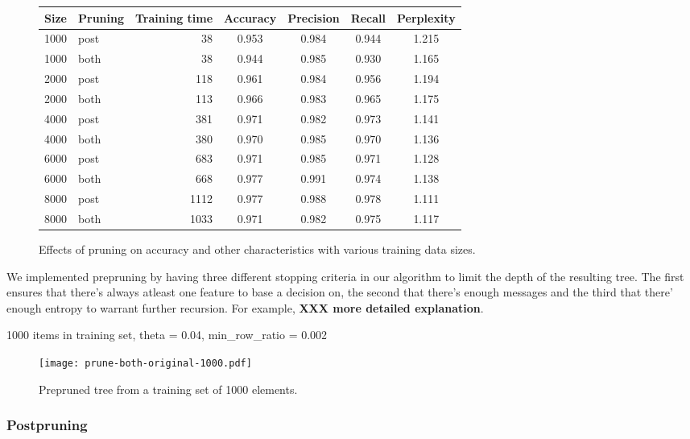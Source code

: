 \documentclass[a4paper,10pt]{article}
\newcommand{\XXX}[1]{{\bf XXX #1}}
\begin{document}
\begin{figure}
  \centering
\begin{tabular}{|l|l|r|c|c|c|c|}
\hline
Size & Pruning & Training time & Accuracy & Precision & Recall &
Perplexity \\ \hline 
1000 & post & 38 & 0.953 & 0.984 & 0.944 & 1.215 \\
1000 & both & 38 & 0.944 & 0.985 & 0.930 & 1.165 \\
2000 & post & 118 & 0.961 & 0.984 & 0.956 & 1.194 \\
2000 & both & 113 & 0.966 & 0.983 & 0.965 & 1.175 \\
4000 & post & 381 & 0.971 & 0.982 & 0.973 & 1.141 \\
4000 & both & 380 & 0.970 & 0.985 & 0.970 & 1.136 \\
6000 & post & 683 & 0.971 & 0.985 & 0.971 & 1.128 \\
6000 & both & 668 & 0.977 & 0.991 & 0.974 & 1.138 \\
8000 & post & 1112 & 0.977 & 0.988 & 0.978 & 1.111 \\
8000 & both & 1033 & 0.971 & 0.982 & 0.975 & 1.117 \\
\hline
\end{tabular}
  \caption{Effects of pruning on accuracy and other characteristics with
    various training data sizes.}
  \label{tbl:classifiers} 
\end{figure}

We implemented prepruning by having three different stopping criteria in
our algorithm to limit the depth of the resulting tree.  The first ensures
that there's always atleast one feature to base a decision on, the second
that there's enough messages and the third that there' enough entropy to
warrant further recursion.  For example, \XXX{more detailed explanation}.

1000 items in training set, theta = 0.04, min\_row\_ratio = 0.002

\begin{figure}[h]
  \centering
  \begin{minipage}[c]{1.0\textwidth}
    \centering
\texttt{[image: prune-both-original-1000.pdf]}
  \end{minipage}
  \caption{Prepruned tree from a training set of 1000 elements.}
  \label{fig:prepruned-1000}
\end{figure}

\subsubsection{Postpruning}
\label{sect:postpruning}
\end{document}
